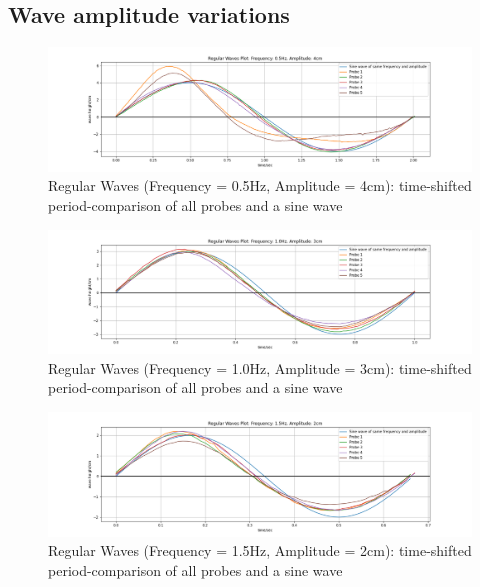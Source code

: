 \documentclass{article}
\begin{document}
	\subsection{Wave amplitude variations}
	\begin{figure}[H]
		\centering
		\includegraphics[clip, trim = {3.3cm 0.5cm 3.4cm 1cm},width=\textwidth]{../graphs/F05A4AllProbes.png}
		\caption{Regular Waves (Frequency = 0.5Hz, Amplitude = 4cm): time-shifted period-comparison of all probes and a sine wave}
		\label{f05a4allprobes}
	\end{figure}
	\vspace{-.5cm}
	\begin{figure}[H]
		\centering
		\includegraphics[clip, trim = {3.3cm 0.5cm 3.4cm 1cm},width=\textwidth]{../graphs/F10A3AllProbes.png}
		\caption{Regular Waves (Frequency = 1.0Hz, Amplitude = 3cm): time-shifted period-comparison of all probes and a sine wave}
		\label{f10a3allprobes}
	\end{figure}
	\vspace{-.5cm}
	\begin{figure}[H]
		\centering
		\includegraphics[clip, trim = {3.3cm 0.5cm 3.4cm 1cm},width=\textwidth]{../graphs/F15A2AllProbes.png}
		\caption{Regular Waves (Frequency = 1.5Hz, Amplitude = 2cm): time-shifted period-comparison of all probes and a sine wave}
		\label{f15a2allprobes}
	\end{figure}
\end{document}
